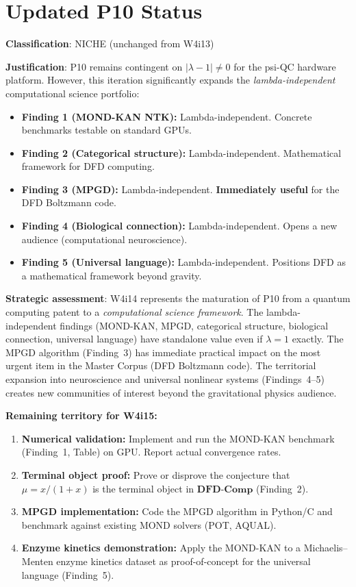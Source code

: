 \documentclass[11pt]{article}
\theoremstyle{definition}
\theoremstyle{remark}
\begin{document}
\section{Updated P10 Status}
\label{sec:p10-status}

\textbf{Classification}: NICHE (unchanged from W4i13)

\textbf{Justification}: P10 remains contingent on $|\lambda-1| \neq 0$ for
the psi-QC hardware platform. However, this iteration significantly expands
the \emph{lambda-independent} computational science portfolio:

\begin{itemize}[nosep]
\item \textbf{Finding 1 (MOND-KAN NTK):} Lambda-independent. Concrete
  benchmarks testable on standard GPUs.
\item \textbf{Finding 2 (Categorical structure):} Lambda-independent.
  Mathematical framework for DFD computing.
\item \textbf{Finding 3 (MPGD):} Lambda-independent. \textbf{Immediately
  useful} for the DFD Boltzmann code.
\item \textbf{Finding 4 (Biological connection):} Lambda-independent.
  Opens a new audience (computational neuroscience).
\item \textbf{Finding 5 (Universal language):} Lambda-independent.
  Positions DFD as a mathematical framework beyond gravity.
\end{itemize}

\textbf{Strategic assessment}: W4i14 represents the maturation of P10 from
a quantum computing patent to a \emph{computational science framework}.
The lambda-independent findings (MOND-KAN, MPGD, categorical structure,
biological connection, universal language) have standalone value even if
$\lambda = 1$ exactly. The MPGD algorithm (Finding~3) has immediate
practical impact on the most urgent item in the Master Corpus (DFD
Boltzmann code). The territorial expansion into neuroscience and universal
nonlinear systems (Findings~4--5) creates new communities of interest
beyond the gravitational physics audience.

\textbf{Remaining territory for W4i15:}
\begin{enumerate}[nosep]
\item \textbf{Numerical validation:} Implement and run the MOND-KAN benchmark
  (Finding~1, Table) on GPU. Report actual convergence rates.
\item \textbf{Terminal object proof:} Prove or disprove the conjecture that
  $\mu = x/(1+x)$ is the terminal object in $\mathbf{DFD\text{-}Comp}$
  (Finding~2).
\item \textbf{MPGD implementation:} Code the MPGD algorithm in Python/C
  and benchmark against existing MOND solvers (POT, AQUAL).
\item \textbf{Enzyme kinetics demonstration:} Apply the MOND-KAN to a
  Michaelis--Menten enzyme kinetics dataset as proof-of-concept for the
  universal language (Finding~5).
\end{enumerate}
\end{document}
